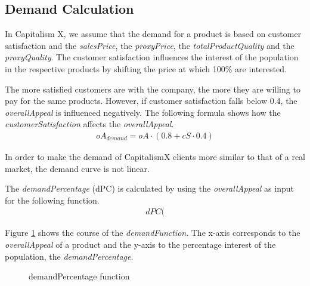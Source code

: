 \subsection{Demand Calculation} \label{demandCalc}

In Capitalism X, we assume that the demand for a product is based on customer satisfaction and the \textit{salesPrice}, the \textit{proxyPrice}, the \textit{totalProductQuality} and the \textit{proxyQuality}. 
The customer satisfaction influences the interest of the population in the respective products by shifting the price at which 100\% are interested.
 
The more satisfied customers are with the company, the more they are willing to pay for the same products. However, if customer satisfaction falls below 0.4, the \textit{overallAppeal} is influenced negatively. The following formula shows how the \textit{customerSatisfaction} affects the \textit{overallAppeal}.
\begin{equation}
\label{func:demandPrice}
\begin{aligned}
 oA_{demand} = oA \cdot (0.8 + cS \cdot 0.4)
\end{aligned}
\end{equation}

In order to make the demand of CapitalismX clients more similar to that of a real market, the demand curve is not linear. 

The \textit{demandPercentage} (\gls{dPC}) is calculated by using the \textit{overallAppeal} as input for the following function. 
\begin{equation}
\label{func:demandPercentage}
\begin{aligned}
dPC(
\end{aligned}
\end{equation}

Figure \ref{demand_function} shows the course of the \textit{demandFunction}. The x-axis corresponds to the \textit{overallAppeal} of a product and the y-axis to the percentage interest of the population, the \textit{demandPercentage}. 

\begin{figure}[h]
\centering
{}
	\caption{demandPercentage function}
	\label{demand_function}
\end{figure}

